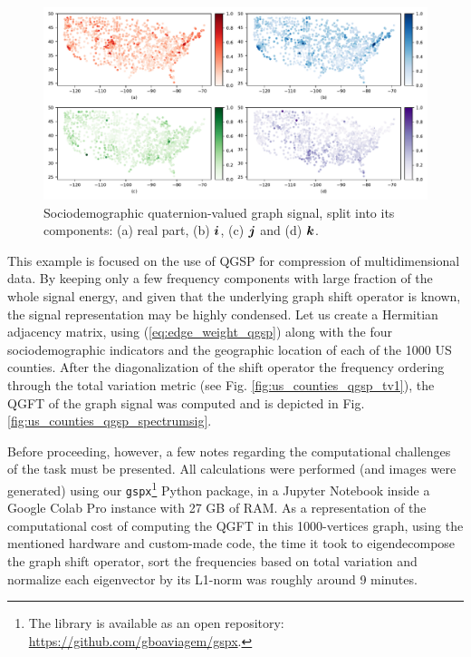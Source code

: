 \begin{figure}
    \centering
    \includegraphics[width=0.95\linewidth]{Figures/usa_example/us_signal.pdf}
    \caption{Sociodemographic quaternion-valued graph signal, split into its components: (a) real part, (b) $\boldsymbol{i}$, (c) $\boldsymbol{j}$ and (d) $\boldsymbol{k}$.}
    \label{fig:us_signal}
\end{figure}

This example is focused on the use of QGSP for compression of multidimensional data. By keeping only a few frequency components with large fraction of the whole signal energy, and given that the underlying graph shift operator is known, the signal representation may be highly condensed. Let us create a Hermitian adjacency matrix, using (\ref{eq:edge_weight_qgsp}) along with the four sociodemographic indicators and the geographic location of each of the 1000 US counties. After the diagonalization of the shift operator the frequency ordering through the total variation metric (see Fig. \ref{fig:us_counties_qgsp_tv1}), the QGFT of the graph signal was computed and is depicted in Fig. \ref{fig:us_counties_qgsp_spectrumsig}.

Before proceeding, however, a few notes regarding the computational challenges of the task must be presented. All calculations were performed (and images were generated) using our \texttt{gspx}\footnote{The library is available as an open repository: \url{https://github.com/gboaviagem/gspx}.} Python package, in a Jupyter Notebook inside a Google Colab Pro instance with 27 GB of RAM. As a representation of the computational cost of computing the QGFT in this 1000-vertices graph, using the mentioned hardware and custom-made code, the time it took to eigendecompose the graph shift operator, sort the frequencies based on total variation and normalize each eigenvector by its L1-norm was roughly around 9 minutes.


